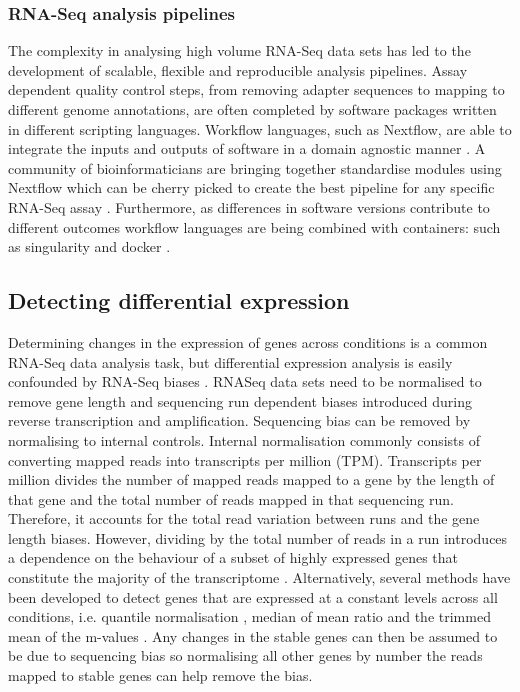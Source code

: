 \documentclass[../main.tex]{subfiles}
\begin{document}
\subsubsection{RNA-Seq analysis pipelines}

The complexity in analysing high volume RNA-Seq data sets has led to the development of scalable, flexible and reproducible analysis pipelines.
Assay dependent quality control steps, from removing adapter sequences to mapping to different genome annotations, are often completed by software packages written in different scripting languages.
Workflow languages, such as Nextflow, are able to integrate the inputs and outputs of software in a domain agnostic manner \parencite{DiTommaso2017}.
A community of bioinformaticians are bringing together standardise modules using Nextflow which can be cherry picked to create the best pipeline for any specific RNA-Seq assay \parencite{Ewels2020}.
Furthermore, as differences in software versions contribute to different outcomes workflow languages are being combined with containers: such as singularity and docker \parencite{DiTommaso2015}.

\subsection{Detecting differential expression}

Determining changes in the expression of genes across conditions is a common RNA-Seq data  analysis task, but differential expression analysis is easily confounded by RNA-Seq biases \parencite{Soneson2018}.
RNASeq data sets need to be normalised to remove gene length and sequencing run dependent biases introduced during reverse transcription and amplification. 
Sequencing bias can be removed by normalising to internal controls. 
Internal normalisation commonly consists of converting mapped reads into transcripts per million (TPM).
Transcripts per million divides the number of mapped reads mapped to a gene by the length of that gene and the total number of reads mapped in that sequencing run.
Therefore, it accounts for the total read variation between runs and the gene length biases. 
However, dividing by the total number of reads in a run introduces a dependence on the behaviour of a subset of highly expressed genes that constitute the majority of the transcriptome \parencite{Zhao2020}.
Alternatively, several methods have been developed to detect genes that are expressed at a constant levels across all conditions, i.e. quantile normalisation \parencite{Evans2018}, median of mean ratio \parencite{Anders2010} and the trimmed mean of the m-values \parencite{Robinson2010}. 
Any changes in the stable genes can then be assumed to be due to sequencing bias so normalising all other genes by number the reads mapped to stable genes can help remove the bias.
\end{document}
